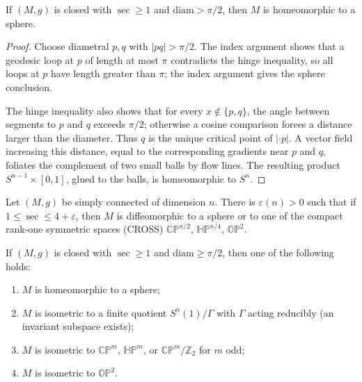 \begin{theorem}
  \label{thm:pet-ch12-diameter-sphere}

  If $(M,g)$ is closed with $\sec\ge1$ and $\mathrm{diam}>\pi/2$, then $M$ is
  homeomorphic to a sphere.
\end{theorem}
\begin{proof}
  \sketch
  Choose diametral \(p,q\) with \(|pq|>\pi/2\). The index argument shows that a geodesic
  loop at \(p\) of length at most \(\pi\) contradicts the hinge inequality,
  so all loops at \(p\) have length greater than \(\pi\); the index argument
  gives the sphere conclusion.

  The hinge inequality also shows that for every \(x\notin\{p,q\}\), the
  angle between segments to \(p\) and \(q\) exceeds \(\pi/2\); otherwise a
  cosine comparison forces a distance larger than the diameter. Thus \(q\) is the
  unique critical point of \( |\cdot p| \). A vector field increasing this
  distance, equal to the corresponding gradients near \(p\) and \(q\), foliates
  the complement of two small balls by flow lines. The resulting product
  \(S^{n-1}\times[0,1]\), glued to the balls, is homeomorphic to \(S^n\).
\end{proof}

\begin{theorem}
  \label{thm:pet-ch12-cross-pinching}

  Let $(M,g)$ be simply connected of dimension $n$. There is $\varepsilon(n)>0$
  such that if $1\le\sec\le4+\varepsilon$, then $M$ is diffeomorphic to a sphere
  or to one of the compact rank-one symmetric spaces (CROSS) $\mathbb{CP}^{n/2}$,
  $\mathbb{HP}^{n/4}$, $\mathbb{OP}^2$.
\end{theorem}

\begin{theorem}
  \label{thm:pet-ch12-diameter-classification}

  If $(M,g)$ is closed with $\sec\ge1$ and $\mathrm{diam}\ge\pi/2$, then one of
  the following holds:
  \begin{enumerate}
    \item $M$ is homeomorphic to a sphere;
    \item $M$ is isometric to a finite quotient $S^n(1)/\Gamma$ with $\Gamma$
      acting reducibly (an invariant subspace exists);
    \item $M$ is isometric to $\mathbb{CP}^m$, $\mathbb{HP}^m$, or
      $\mathbb{CP}^m/\mathbb{Z}_2$ for $m$ odd;
    \item $M$ is isometric to $\mathbb{OP}^2$.
  \end{enumerate}
\end{theorem}


